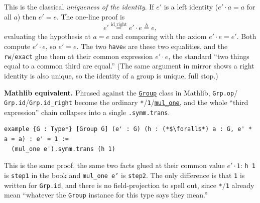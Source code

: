 \begin{mathreading}

This is the classical \emph{uniqueness of the identity}. If \(e'\) is a left identity (\(e'\cdot a = a\) for all \(a\)) then \(e' = e\). The one-line proof is \[
e' \overset{\text{id\_right}}{=} e' \cdot e \overset{h}{=} e,
\] evaluating the hypothesis at \(a = e\) and comparing with the axiom \(e'\cdot e = e'\). Both compute \(e' \cdot e\), so \(e' = e\). The two \texttt{have}s are these two equalities, and the \texttt{rw}/\texttt{exact} glue them at their common expression \(e'\cdot e\), the standard ``two things equal to a common third are equal.'' (The same argument in mirror shows a right identity is also unique, so the identity of a group is unique, full stop.)

\end{mathreading}

\textbf{Mathlib equivalent.} Phrased against the \href{https://loogle.lean-lang.org/?q=Group}{\texttt{Group}} class in Mathlib, \texttt{Grp.op}/ \texttt{Grp.id}/\texttt{Grp.id\_\allowbreak{}right} become the ordinary \texttt{*}/\texttt{1}/\href{https://loogle.lean-lang.org/?q=mul_one}{\texttt{mul\_\allowbreak{}one}}, and the whole ``third expression'' chain collapses into a single \texttt{.symm.trans}.

\begin{lstlisting}
example {G : Type*} [Group G] (e' : G) (h : (*$\forall$*) a : G, e' * a = a) : e' = 1 :=
  (mul_one e').symm.trans (h 1)
\end{lstlisting}

This is the same proof, the same two facts glued at their common value \(e'\cdot 1\): \texttt{h 1} is \texttt{step1} in the book and \texttt{mul\_\allowbreak{}one e'} is \texttt{step2}. The only difference is that \texttt{1} is written for \texttt{Grp.id}, and there is no field-projection to spell out, since \texttt{*}/\texttt{1} already mean ``whatever the \texttt{Group} instance for this type says they mean.''
